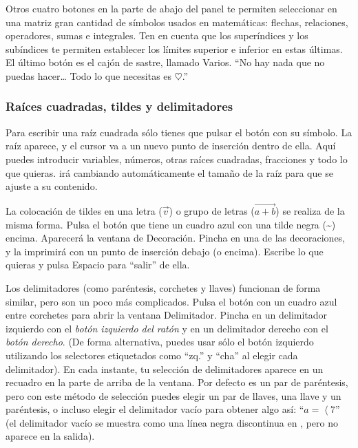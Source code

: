 Otros cuatro botones en la parte de abajo del panel te permiten seleccionar
en una matriz gran cantidad de símbolos usados en matemáticas: flechas,
relaciones, operadores, sumas e integrales. Ten en cuenta que los
superíndices y los subíndices te permiten establecer los límites superior
e inferior en estas últimas. El último botón es el cajón de sastre,
llamado \textsf{Varios}. {}``No hay nada que no puedas hacer\ldots{}
Todo lo que necesitas es $\heartsuit$.''


\subsubsection{Raíces cuadradas, tildes y delimitadores}

Para escribir una raíz cuadrada sólo tienes que pulsar el botón con
su símbolo. La raíz aparece, y el cursor va a un nuevo punto de inserción
dentro de ella. Aquí puedes introducir variables, números, otras raíces
cuadradas, fracciones y todo lo que quieras. \LyX{} irá cambiando
automáticamente el tamaño de la raíz para que se ajuste a su contenido.

La colocación de tildes en una letra ($\overrightarrow{v}$) o grupo
de letras ($\overrightarrow{a+b}$) se realiza de la misma forma.
Pulsa el botón que tiene un cuadro azul con una tilde negra (\textasciitilde{})
encima. Aparecerá la ventana de \textsf{Decoración}. Pincha en una
de las decoraciones, y \LyX{} la imprimirá con un punto de inserción
debajo (o encima). Escribe lo que quieras y pulsa \textsf{Espacio}
para {}``salir'' de ella.

Los delimitadores (como paréntesis, corchetes y llaves) funcionan
de forma similar, pero son un poco más complicados. Pulsa el botón
con un cuadro azul entre corchetes para abrir la ventana \textsf{Delimitador}.
Pincha en un delimitador izquierdo con el \emph{botón izquierdo del
ratón} y en un delimitador derecho con el \emph{botón derecho}. (De
forma alternativa, puedes usar sólo el botón izquierdo utilizando
los selectores etiquetados como {}``zq.'' y {}``cha''
al elegir cada delimitador). En cada instante, tu selección de delimitadores
aparece en un recuadro en la parte de arriba de la ventana. Por defecto
es un par de paréntesis, pero con este método de selección puedes
elegir un par de llaves, una llave y un paréntesis, o incluso elegir
el delimitador vacío para obtener algo así: {}``$a=\left\langle 7\right.$''
(el delimitador vacío se muestra como una línea negra discontinua
en \LyX{}, pero no aparece en la salida).

